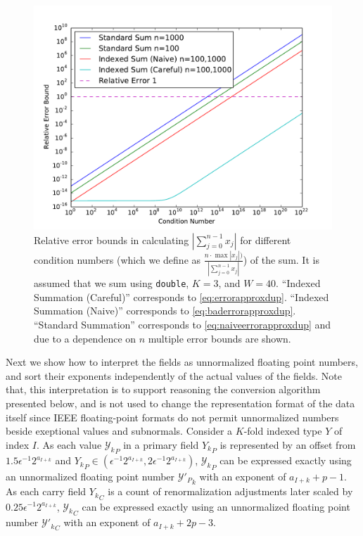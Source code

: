 \begin{figure}[H]
\begin{center}
\includegraphics[width=\textwidth]{plots/errorcomparison.pdf}
\caption{Relative error bounds in calculating $|\sum \limits_{j = 0}^{n - 1}
x_j|$ for different condition numbers (which we define as $\frac{n \cdot \max
|x_j|)}{|\sum \limits_{j = 0}^{n - 1} x_j|}$) of the sum. It is assumed that we
sum using \texttt{double}, $K = 3$, and $W = 40$. ``Indexed Summation
(Careful)'' corresponds to \eqref{eq:errorapproxdup}. ``Indexed Summation
(Naive)'' corresponds to \eqref{eq:baderrorapproxdup}. ``Standard Summation''
corresponds to \eqref{eq:naiveerrorapproxdup} and due to a dependence on $n$
multiple error bounds are shown.}
\label{fig:conversionmotivation}
\end{center}
\end{figure}

    Next we show how to interpret the fields as unnormalized floating point numbers,
    and sort their exponents independently of the actual values of the fields.
    Note that, this interpretation is to support reasoning the conversion algorithm
    presented below, and is not used to change the representation format of the data itself
    since IEEE floating-point formats do not permit unnormalized numbers
    beside exeptional values and subnormals.
    Consider a $K$-fold indexed type $Y$ of index $I$.
    As each value ${\mathcal{Y}_k}_P$ in a primary field ${Y_k}_P$ is represented by an offset from $1.5  \epsilon^{-1}  2^{a_{I + k}}$ and ${Y_k}_P \in (\epsilon^{-1}  2^{a_{I + k}}, 2  \epsilon^{-1}  2^{a_{I + k}})$, ${\mathcal{Y}_k}_P$ can be expressed exactly using an unnormalized floating point number ${\mathcal{Y}'_P}_k$ with an exponent of $a_{I + k} + p - 1$.
    As each carry field ${Y_k}_C$ is a count of renormalization adjustments later scaled by $0.25  \epsilon^{-1}  2^{a_{I + k}}$, ${\mathcal{Y}_k}_C$ can be expressed exactly using an unnormalized floating point number ${\mathcal{Y}'_k}_C$ with an exponent of $a_{I + k} + 2  p - 3$.

